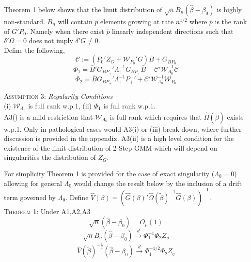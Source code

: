 \documentclass[11pt, fleqn]{article}
\begin{document}
 Theorem 1 below shows that the limit distribution of $\sqrt{n}B_n(\hat{\beta}-\beta_0)$ is highly non-standard. $B_n$ will contain $\bar{p}$ elements growing at rate $n^{1/2}$ where $\bar{p}$ is the rank of $G'P_0$. Namely when there exist $\bar{p}$ linearly independent directions such that $\delta'\Omega=0$ does not imply $\delta'G\neq0$.\\
Define the following,
  \begin{equation} \mathcal{C}:=(P_0'\bar{Z}_{G}+ \mathcal{W}_{P_0}'G)\bar{B}+G_{BP_0}\end{equation} \begin{equation} \Phi_1=\bar{B}'G_{BP_+}'\Lambda_+^{-1}G_{BP_+}\bar{B}+\mathcal{C}'\mathcal{W}_{\Lambda_0}^{-1}\mathcal{C} \end{equation} \begin{equation} \Phi_2=\bar{B}G_{BP_+}'\Lambda_+^{-1}P_+' +
  \mathcal{C}'\mathcal{W}_{\Lambda_0}^{-1}\mathcal{W}_{P_0} \end{equation}


  \textsc{ Assumption 3}:\textit{ Regularity Conditions}\\
(i) $\mathcal{W}_{\Lambda_0}$ is full rank w.p.1, (ii) $\Phi_1$ is full rank w.p.1.\\

  A3() is a mild restriction that $\mathcal{W}_{\Lambda_0}$ is full rank which requires that $\hat{\Omega}(\tilde{\beta})$ exists w.p.1. Only in pathological cases would A3(i) or (iii) break down, where further discussion is provided in the appendix. A3(ii) is a high level condition for the existence of the limit distribution of 2-Step GMM which will depend on singularities the distribution of $Z_G$.

For simplicity Theorem 1 is provided for the case of exact singularity ($\Lambda_0=0$) allowing for general $\Lambda_0$ would change the result below by the inclusion of a drift term governed by $\Lambda_0$. Define $\hat{V}(\beta)=(\hat{G}(\beta)'\hat{\Omega}(\tilde{\beta})^{-1}\hat{G}(\beta))^{-1}$.\\

  \textsc{Theorem 1}:  Under A1,A2,A3
   \begin{equation} \label{consistency} \sqrt{n}(\hat{\beta}- \beta_0)= O_p(1) \end{equation}
  \begin{equation}  \label{limit} \sqrt{n}B_n(\hat{\beta}- \beta_0)\overset{d}{\rightarrow} \Phi_1^{-1}\Phi_2Z_g\end{equation}
  \begin{equation*}  \label{limit1}\hat{V}(\tilde{\beta})^{-\frac{1}{2}}(\hat{\beta}- \beta_0)\overset{d}{\rightarrow} \Phi_1^{-1/2}\Phi_2 Z_g\end{equation*}
\end{document}
